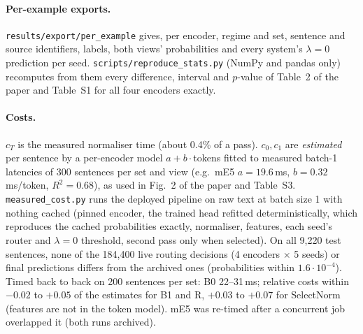 \documentclass[runningheads]{llncs}
\begin{document}
\paragraph{Per-example exports.} \texttt{results/export/per\_example} gives, per encoder, regime and set, sentence and source identifiers, labels, both views' probabilities and every system's $\lambda{=}0$ prediction per seed. \texttt{scripts/reproduce\_stats.py} (NumPy and pandas only) recomputes from them every difference, interval and $p$-value of Table~2 of the paper and Table~S1 for all four encoders exactly.

\paragraph{Costs.} $c_T$ is the measured normaliser time (about 0.4\% of a pass). $c_0,c_1$ are \emph{estimated} per sentence by a per-encoder model $a+b\cdot$tokens fitted to measured batch-1 latencies of 300 sentences per set and view (e.g.\ mE5 $a=19.6$\,ms, $b=0.32$\,ms/token, $R^2=0.68$), as used in Fig.~2 of the paper and Table~S3. \texttt{measured\_cost.py} runs the deployed pipeline on raw text at batch size 1 with nothing cached (pinned encoder, the trained head refitted deterministically, which reproduces the cached probabilities exactly, normaliser, features, each seed's router and $\lambda{=}0$ threshold, second pass only when selected). On all 9{,}220 test sentences, none of the 184{,}400 live routing decisions (4 encoders $\times$ 5 seeds) or final predictions differs from the archived ones (probabilities within $1.6\cdot10^{-4}$). Timed back to back on 200 sentences per set: B0 22--31\,ms; relative costs within $-0.02$ to $+0.05$ of the estimates for B1 and R, $+0.03$ to $+0.07$ for SelectNorm (features are not in the token model). mE5 was re-timed after a concurrent job overlapped it (both runs archived).
\end{document}
